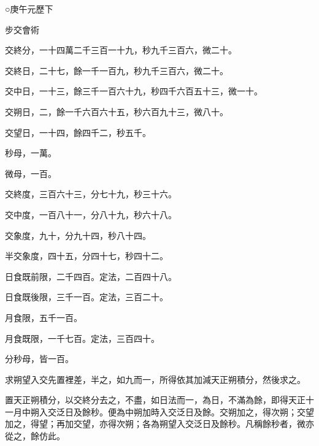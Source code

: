 
\begin{pinyinscope}

 ○庚午元歷下



 步交會術



 交終分，一十四萬二千三百一十九，秒九千三百六，微二十。



 交終日，二十七，餘一千一百九，秒九千三百六，微二十。



 交中日，一十三，餘三千一百六十九，秒四千六百五十三，微一十。



 交朔日，二，餘一千六百六十五，秒六百九十三，微八十。



 交望日，一十四，餘四千二，秒五千。



 秒母，一萬。



 微母，一百。



 交終度，三百六十三，分七十九，秒三十六。



 交中度，一百八十一，分八十九，秒六十八。



 交象度，九十，分九十四，秒八十四。



 半交象度，四十五，分四十七，秒四十二。



 日食既前限，二千四百。定法，二百四十八。



 日食既後限，三千一百。定法，三百二十。



 月食限，五千一百。



 月食既限，一千七百。定法，三百四十。



 分秒母，皆一百。



 求朔望入交先置裡差，半之，如九而一，所得依其加減天正朔積分，然後求之。



 置天正朔積分，以交終分去之，不盡，如日法而一，為日，不滿為餘，即得天正十一月中朔入交泛日及餘秒。便為中朔加時入交泛日及餘。交朔加之，得次朔；交望加之，得望；再加交望，亦得次朔；各為朔望入交泛日及餘秒。凡稱餘秒者，微亦從之，餘仿此。




\end{pinyinscope}
